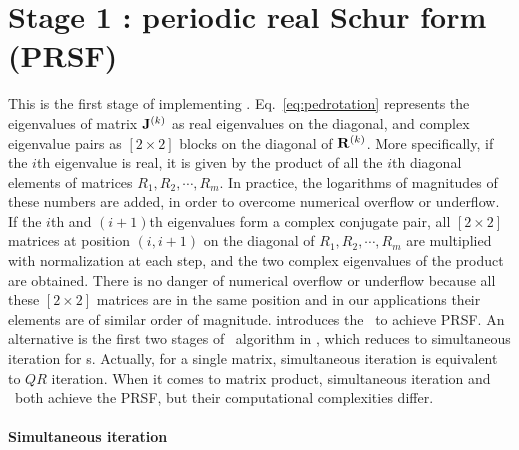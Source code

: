 \section{Stage 1 :  periodic real Schur form (PRSF)}
\label{sect:psd}
This is the first stage of implementing \ped.
Eq.~\eqref{eq:pedrotation} represents the eigenvalues of matrix
$\mathbf{J}^{(k)}$ as real eigenvalues on the diagonal, and complex
eigenvalue pairs as $[2\!\times\! 2]$ blocks on the diagonal of
$\mathbf{R}^{(k)}$. More specifically, if the $i$th
eigenvalue is real, it is given by the product of all the $i$th
diagonal elements of matrices $R_{1},R_{2},\cdots,R_{m}$. In practice,
the logarithms of magnitudes of these numbers are added, in order to
overcome numerical {overflow or underflow}. If the $i$th and $(i+1)$th
eigenvalues form a complex conjugate pair, all $[2\!\times\! 2]$ matrices
at position $(i,i+1)$ on the diagonal of $R_{1},R_{2},\cdots,R_{m}$ are
multiplied with normalization at each step, and the two complex
eigenvalues of the product are obtained. There is no danger of numerical
{overflow or underflow}
because all these $[2\!\times\! 2]$  matrices are in the same
position and  in our applications their elements are of similar order of
magnitude.
 introduces the \psd\ to achieve PRSF. An
alternative is the first two stages of {\cLv\ algorithm} in ,
which reduces to simultaneous iteration for \po s.
{Actually, for a single matrix,
  simultaneous iteration is equivalent to $QR$ iteration.
  When it comes to matrix product, simultaneous iteration and \psd\ both
  achieve the PRSF, but their computational complexities differ.}

\paragraph{Simultaneous iteration}

